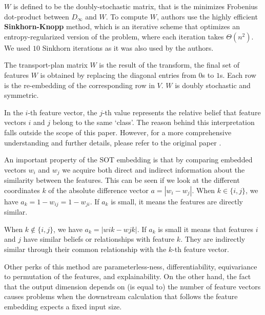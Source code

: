 \( W \) is defined to be the doubly-stochastic matrix, that is the minimizes Frobenius dot-product between $D_{\infty}$ and $W$. To compute $W$, authors use the highly efficient \textbf{Sinkhorn-Knopp} method, which is an iterative scheme that optimizes an entropy-regularized version of the problem, where each iteration takes $\Theta(n^2)$. We used $10$ Sinkhorn iterations as it was also used by the authors.

The transport-plan matrix $W$ is the result of the transform, the final set of features $W$ is obtained by replacing the diagonal entries from $0$s to $1$s. Each row is the re-embedding of the corresponding row in $V$. $W$ is doubly stochastic and symmetric.

In the $i$-th feature vector, the $j$-th value represents the relative belief that feature vectors $i$ and $j$ belong to the same `class'. The reason behind this interpretation falls outside the scope of this paper. However, for a more comprehensive understanding and further details, please refer to the original paper \cite{sot}.

An important property of the SOT embedding is that by comparing embedded vectors $w_i$ and $w_j$ we acquire both direct and indirect information about the similarity between the features. This can be seen if we look at the different coordinates $k$ of the absolute difference vector $a=|w_i - w_j|$. When $k\in\{i,j\}$, we have $a_k = 1 - w_{ij} = 1 - w_{ji}$. If \( a_k \) is small, it means the features are directly similar.

When $k \notin \{i,j\}$, we have $a_k = |wik - wjk|$. If $a_k$ is small it means that features $i$ and $j$ have similar beliefs or relationships with feature $k$. They are indirectly similar through their common relationship with the $k$-th feature vector.

Other perks of this method are parameterless-ness, differentiability, equivariance to permutation of the features, and explainability. On the other hand, the fact that the output dimension depends on (is equal to) the number of feature vectors causes problems when the downstream calculation that follows the feature embedding expects a fixed input size.